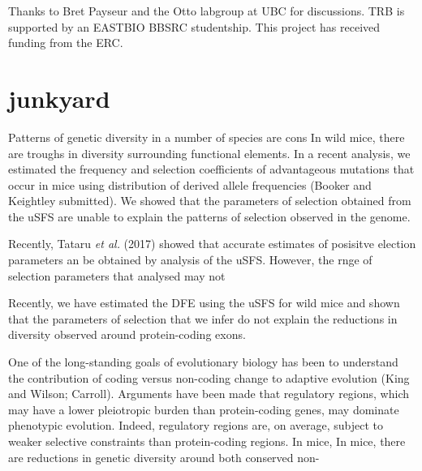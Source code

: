 \documentclass[11pt]{article}
\begin{document}
Thanks to Bret Payseur and the Otto labgroup at UBC for discussions. TRB is supported by an EASTBIO BBSRC studentship. This project has received funding from the ERC.


\section*{junkyard}

Patterns of genetic diversity in a number of species are cons
In wild mice, there are troughs in diversity surrounding functional elements. In a recent analysis, we estimated the frequency and selection coefficients of advantageous mutations that occur in mice using distribution of derived allele frequencies (Booker and Keightley submitted). We showed that the parameters of selection obtained from the uSFS are unable to explain the patterns of selection observed in the genome.

Recently, Tataru \textit{et al.} (2017) showed that accurate estimates of posisitve election parameters an be obtained by analysis of the uSFS. However, the rnge of selection parameters that analysed may not

Recently, we have estimated the DFE using the uSFS for wild mice and shown that the parameters of selection that we infer do not explain the reductions in diversity observed around protein-coding exons. 


One of the long-standing goals of evolutionary biology has been to understand the contribution of coding versus non-coding change to adaptive evolution (King and Wilson; Carroll). Arguments have been made that regulatory regions, which may have a lower pleiotropic burden than protein-coding genes, may dominate phenotypic evolution. Indeed, regulatory regions are, on average,  subject to weaker selective constraints than protein-coding regions. In mice, 
In mice, there are reductions in genetic diversity around both conserved non-
\end{document}
